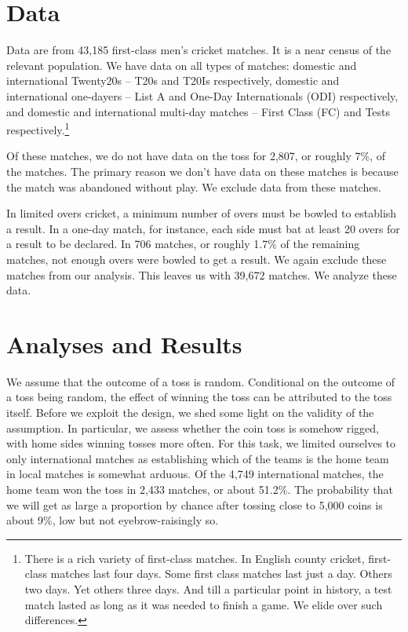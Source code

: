 \documentclass[12pt]{article}
\begin{document}
\section*{Data}
Data are from 43,185 first-class men's cricket matches. It is a near census of the relevant population. We have data on all types of matches: domestic and international Twenty20s -- T20s and T20Is respectively, domestic and international one-dayers -- List A and One-Day Internationals (ODI) respectively, and domestic and international multi-day matches -- First Class (FC) and Tests respectively.\footnote{There is a rich variety of first-class matches. In English county cricket, first-class matches last four days. Some first class matches last just a day. Others two days. Yet others three days. And till a particular point in history, a test match lasted as long as it was needed to finish a game. We elide over such differences.} 

Of these matches, we do not have data on the toss for 2,807, or roughly 7\%, of the matches. The primary reason we don't have data on these matches is because the match was abandoned without play. We exclude data from these matches. 

In limited overs cricket, a minimum number of overs must be bowled to establish a result. In a one-day match, for instance, each side must bat at least 20 overs for a result to be declared. In 706 matches, or roughly 1.7\% of the remaining matches, not enough overs were bowled to get a result. We again exclude these matches from our analysis. This leaves us with 39,672 matches. We analyze these data.
 
\section*{Analyses and Results}

We assume that the outcome of a toss is random. Conditional on the outcome of a toss being random, the effect of winning the toss can be attributed to the toss itself. Before we exploit the design, we shed some light on the validity of the assumption. In particular, we assess whether the coin toss is somehow rigged, with home sides winning tosses more often. For this task, we limited ourselves to only international matches as establishing which of the teams is the home team in local matches is somewhat arduous. Of the 4,749 international matches, the home team won the toss in 2,433 matches, or about 51.2\%. The probability that we will get as large a proportion by chance after tossing close to 5,000 coins is about 9\%, low but not eyebrow-raisingly so. 
\end{document}
